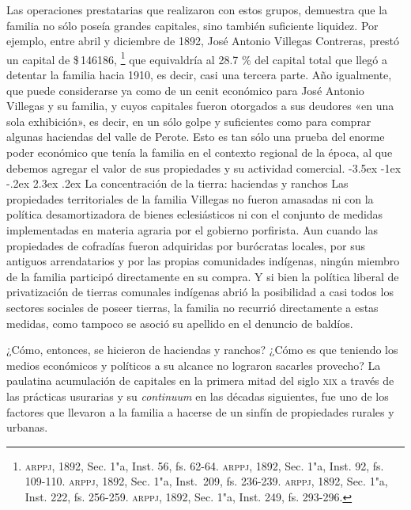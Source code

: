 \documentclass[14pt,twoside,final]{extbook} %
\makeatletter
\let\oldfootnote\footnote
\renewcommand\footnote[1]{%
\oldfootnote{\hspace{1mm}#1}}
\renewcommand\section{\@startsection {section}{1}{\z@}%
                                     {-3.5ex \@plus -1ex \@minus -.2ex}%
                                     {2.3ex \@plus .2ex}%
                                     {\normalfont\large\bfseries\sc}}
\makeatother
\begin{document}
Las operaciones prestatarias que realizaron con estos grupos, demuestra que la familia no sólo poseía grandes capitales, sino también suficiente liquidez. Por ejemplo, entre abril y diciembre de 1892, José Antonio Villegas Contreras, prestó un capital de \$\,146186,\footnote{\textsc{arppj}, 1892, Sec. 1"a, Inst. 56, fs. 62-64. \textsc{arppj}, 1892, Sec. 1"a, Inst. 92, fs. 109-110. \textsc{arppj}, 1892, Sec. 1"a, Inst.~209, fs. 236-239. \textsc{arppj}, 1892, Sec. 1"a, Inst. 222, fs. 256-259. \textsc{arppj}, 1892, Sec. 1"a, Inst. 249, fs. 293-296.} que equivaldría al 28.7 \% del capital total que llegó a detentar la familia hacia 1910, es decir, casi una tercera parte. Año igualmente, que puede considerarse ya como de un cenit económico para José Antonio Villegas y su familia, y cuyos capitales fueron otorgados a sus deudores «en una sola exhibición», es decir, en un sólo golpe y suficientes como para comprar algunas haciendas del valle de Perote. Esto es tan sólo una prueba del enorme poder económico que tenía la familia en el contexto regional de la época, al que debemos agregar el valor de sus propiedades y su actividad comercial.
\section{La concentración de la tierra: haciendas y ranchos}
\label{sec:concentracion-haciendas-y-ranchos}
Las propiedades territoriales de la familia Villegas no fueron amasadas ni con la política desamortizadora de bienes eclesiásticos ni con el conjunto de medidas implementadas en materia agraria por el gobierno porfirista. Aun cuando las propiedades de cofradías fueron adquiridas por burócratas locales, por sus antiguos arrendatarios y por las propias comunidades indígenas, ningún miembro de la familia participó directamente en su compra. Y si bien la política liberal de privatización de tierras comunales indígenas abrió la posibilidad a casi todos los sectores sociales de poseer tierras, la familia no recurrió directamente a estas medidas, como tampoco se asoció su apellido en el denuncio de baldíos.

¿Cómo, entonces, se hicieron de haciendas y ranchos? ¿Cómo es que teniendo los medios económicos y políticos a su alcance no lograron sacarles provecho? La paulatina acumulación de capitales en la primera mitad del siglo \textsc{xix} a través de las prácticas usurarias y su \emph{continuum} en las décadas siguientes, fue uno de los factores que llevaron a la familia a hacerse de un sinfín de propiedades rurales y urbanas.
\end{document}
